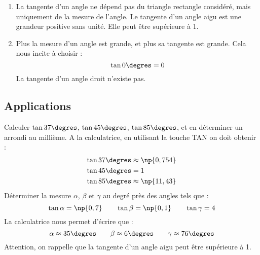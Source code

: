 \begin{propriete}
	\begin{enumerate}
		\item La tangente d'un angle ne dépend pas du triangle rectangle considéré, mais uniquement de la mesure de l'angle. Le  tangente d'un angle aigu est une grandeur positive sans unité. Elle peut être supérieure à 1.
		\item Plus la mesure d'un angle est grande, et plus sa tangente est grande. Cela nous incite à choisir :
		\[\tan 0\degres = 0\]
La tangente d'un angle droit n'existe pas.  
	\end{enumerate}


\end{propriete}	
	
	
	\subsection{Applications}
	\begin{methode*2*2}
	\exercice
Calculer $\tan 37\degres$, $\tan 45\degres$, $\tan 85\degres$, et en déterminer un arrondi au millième.
	\correction
A la calculatrice, en utilisant la touche TAN on doit obtenir :
\begin{align*}
\tan 37\degres & \approx \np{0,754}\\
\tan 45\degres & = 1\\
\tan 85\degres & \approx \np{11,43}
\end{align*}
	\exercice 
Déterminer la mesure $\alpha$, $\beta$ et $\gamma$ au degré près des angles tels que :
\[\tan \alpha = \np{0,7}\qquad\tan \beta = \np{0,1}\qquad\tan \gamma = 4 \]
	\correction
La calculatrice nous permet d'écrire que :
\[\alpha\approx 35\degres\qquad\beta\approx 6\degres\qquad\gamma\approx76\degres\]
Attention, on rappelle que la tangente d'un angle aigu peut être supérieure à 1.
	\end{methode*2*2}
		


